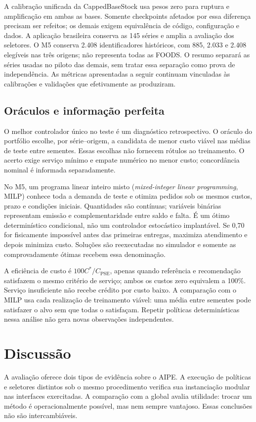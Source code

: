 \documentclass[preprint,12pt]{elsarticle}
\begin{document}
A calibração unificada da CappedBaseStock usa pesos zero para ruptura e amplificação em ambas as bases. Somente checkpoints afetados por essa diferença precisam ser refeitos; os demais exigem equivalência de código, configuração e dados. A aplicação brasileira conserva as 145 séries e amplia a avaliação dos seletores. O M5 conserva 2.408 identificadores históricos, com 885, 2.033 e 2.408 elegíveis nas três origens; não representa todas as FOODS. O resumo separará as séries usadas no piloto das demais, sem tratar essa separação como prova de independência. As métricas apresentadas a seguir continuam vinculadas às calibrações e validações que efetivamente as produziram.

\subsection{Oráculos e informação perfeita}
O melhor controlador único no teste é um diagnóstico retrospectivo. O oráculo do portfólio escolhe, por série--origem, a candidata de menor custo viável nas médias de teste entre sementes. Essas escolhas não fornecem rótulos ao treinamento. O acerto exige serviço mínimo e empate numérico no menor custo; concordância nominal é informada separadamente.

No M5, um programa linear inteiro misto (\textit{mixed-integer linear programming}, MILP) conhece toda a demanda de teste e otimiza pedidos sob os mesmos custos, prazo e condições iniciais. Quantidades são contínuas; variáveis binárias representam emissão e complementaridade entre saldo e falta. É um ótimo determinístico condicional, não um controlador estocástico implantável. Se 0,70 for fisicamente impossível antes das primeiras entregas, maximiza atendimento e depois minimiza custo. Soluções são reexecutadas no simulador e somente as comprovadamente ótimas recebem essa denominação.

A eficiência de custo é $100C^*/C_{\mathrm{PSE}}$, apenas quando referência e recomendação satisfazem o mesmo critério de serviço; ambos os custos zero equivalem a 100\%. Serviço insuficiente não recebe crédito por custo baixo. A comparação com o MILP usa cada realização de treinamento viável: uma média entre sementes pode satisfazer o alvo sem que todas o satisfaçam. Repetir políticas determinísticas nessa análise não gera novas observações independentes.





\section{Discussão}
A avaliação oferece dois tipos de evidência sobre o AIPE. A execução de políticas e seletores distintos sob o mesmo procedimento verifica sua instanciação modular nas interfaces exercitadas. A comparação com a global avalia utilidade: trocar um método é operacionalmente possível, mas nem sempre vantajoso. Essas conclusões não são intercambiáveis.
\end{document}
